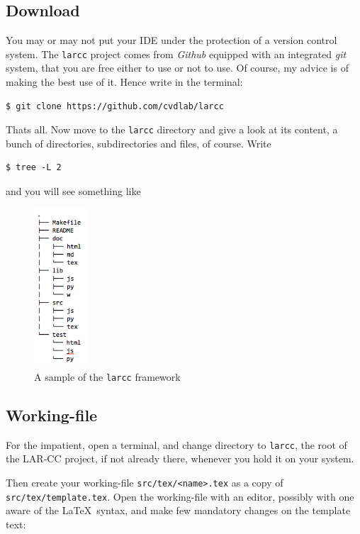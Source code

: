 \documentclass[11pt,oneside]{article}	%
\begin{document}
\subsection{Download}

You may or may not put your IDE under the protection of a version control system. The \texttt{larcc} project comes from \emph{Github} equipped with an integrated \emph{git} system, that you are free either to use or not to use. Of course, my advice  is of making the best use of it. Hence write in the terminal:
\begin{verbatim}
$ git clone https://github.com/cvdlab/larcc
\end{verbatim}

Thats all. Now move to the \texttt{larcc} directory and give a look at its content, a bunch of directories, subdirectories and files, of course. Write
\begin{verbatim}
$ tree -L 2
\end{verbatim}
and you will see something like
\begin{figure}[htbp] %
   \centering
   \includegraphics[width=2cm]{images/tree.png} 
   \caption{A sample of the \texttt{larcc} framework}
   \label{fig:tree}
\end{figure}

\subsection{Working-file}
For the impatient, open a terminal, and change directory to \texttt{larcc}, the root of the LAR-CC project, if not already there, whenever you hold it on your system. 

Then create your working-file \texttt{src/tex/<name>.tex} as a copy of \texttt{src/tex/template.tex}. Open the working-file with an editor, possibly with one aware of the \LaTeX\ syntax, and make few mandatory changes on the template text: 
\end{document}
